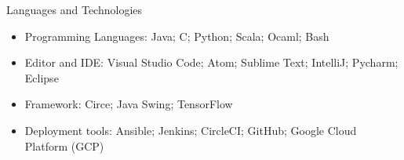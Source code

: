 \documentclass[]{mcdowellcv}
\begin{document}
	\begin{cvsection}{Languages and Technologies}
		\begin{cvsubsection}{}{}{}	
			\begin{itemize}
				\item Programming Languages: Java; C; Python; Scala; Ocaml; Bash
				\item Editor and IDE: Visual Studio Code; Atom; Sublime Text; IntelliJ; Pycharm; Eclipse
				\item Framework: Circe; Java Swing; TensorFlow 
				\item Deployment tools: Ansible; Jenkins; CircleCI; GitHub; Google Cloud Platform (GCP) 
			\end{itemize}
		\end{cvsubsection}
	\end{cvsection}
	
\end{document}
